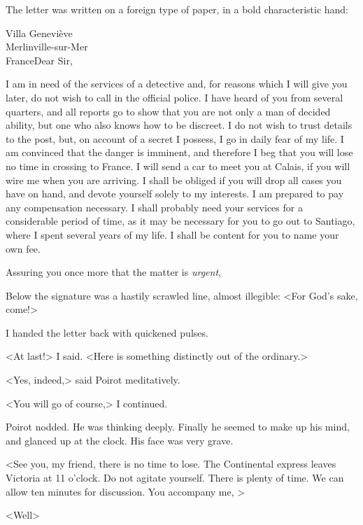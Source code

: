  The letter was written on a foreign type of paper, in a bold characteristic hand: 
 \begin{mail}{Villa Geneviève\\Merlinville-sur-Mer\\France}{Dear Sir,}
 
 I am in need of the services of a detective and, for reasons which I will give you later, do not wish to call in the official police. I have heard of you from several quarters, and all reports go to show that you are not only a man of decided ability, but one who also knows how to be discreet. I do not wish to trust details to the post, but, on account of a secret I possess, I go in daily fear of my life. I am convinced that the danger is imminent, and therefore I beg that you will lose no time in crossing to France. I will send a car to meet you at Calais, if you will wire me when you are arriving. I shall be obliged if you will drop all cases you have on hand, and devote yourself solely to my interests. I am prepared to pay any compensation necessary. I shall probably need your services for a considerable period of time, as it may be necessary for you to go out to Santiago, where I spent several years of my life. I shall be content for you to name your own fee.
 
 Assuring you once more that the matter is \emph{urgent}, 
 
 \end{mail}

 Below the signature was a hastily scrawled line, almost illegible: <For God's sake, come!> 

 I handed the letter back with quickened pulses. 

 <At last!> I said. <Here is something distinctly out of the ordinary.> 

 <Yes, indeed,> said Poirot meditatively. 

 <You will go of course,> I continued. 

 Poirot nodded. He was thinking deeply. Finally he seemed to make up his mind, and glanced up at the clock. His face was very grave. 

 <See you, my friend, there is no time to lose. The Continental express leaves Victoria at 11 o'clock. Do not agitate yourself. There is plenty of time. We can allow ten minutes for discussion. You accompany me, > 

 <Well\longdash> 

